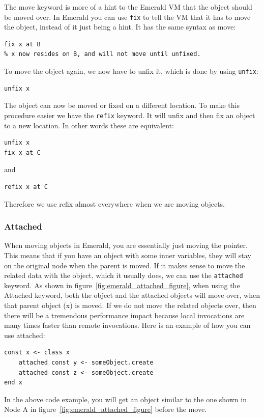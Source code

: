 The move keyword is more of a hint to the Emerald VM that the object should be moved over. In Emerald you can use \verb|fix| to tell the VM that it has to move the object, instead of it just being a hint. It has the same syntax as move:
\begin{lstlisting}[language=emerald]
% x is created and resides on A
fix x at B
% x now resides on B, and will not move until unfixed.
\end{lstlisting}
To move the object again, we now have to unfix it, which is done by using \verb|unfix|:
\begin{lstlisting}[language=emerald]
unfix x
\end{lstlisting}
The object can now be moved or fixed on a different location. To make this procedure easier we have the \verb|refix| keyword. It will unfix and then fix an object to a new location. In other words these are equivalent:
\begin{lstlisting}[language=emerald]
unfix x
fix x at C
\end{lstlisting}
and
\begin{lstlisting}[language=emerald]
refix x at C
\end{lstlisting}
Therefore we use refix almost everywhere when we are moving objects. 



\subsubsection{Attached}
When moving objects in Emerald, you are essentially just moving the pointer. This means that if you have an object with some inner variables, they will stay on the original node when the parent is moved. If it makes sense to move the related data with the object, which it usually does, we can use the \verb|attached| keyword.
As shown in figure~\ref{fig:emerald_attached_figure}, when using the Attached keyword, both the object and the attached objects will move over, when that parent object (x) is moved. If we do not move the related objects over, then there will be a tremendous performance impact because local invocations are many times faster than remote invocations. Here is an example of how you can use attached:
\begin{lstlisting}[language=emerald]
const x <- class x
    attached const y <- someObject.create
    attached const z <- someObject.create
end x
\end{lstlisting}
In the above code example, you will get an object similar to the one shown in Node A in figure~\ref{fig:emerald_attached_figure} before the move.


